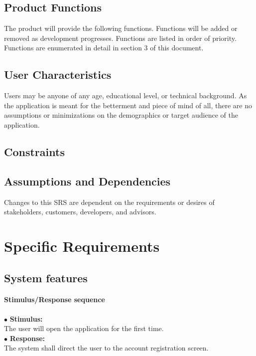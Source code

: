 \documentclass{scrreprt}
\begin{document}
\section{Product Functions}
The product will provide the following functions. Functions will be added or removed as 
development progresses. Functions are listed in order of priority. Functions are enumerated in detail in section 3 of this document.


\section{User Characteristics}
Users may be anyone of any age, educational level, or technical background. As the application is meant for the betterment and piece of mind of all, there are no assumptions or minimizations on the demographics or target audience of the application.


\section{Constraints}


\section{Assumptions and Dependencies}
Changes to this SRS are dependent on the requirements or desires of stakeholders, customers, developers, and advisors. 


\chapter{Specific Requirements}

\section{System features}


\subsubsection{Stimulus/Response sequence}
\vspace{5mm}
	$\bullet$ \textbf{Stimulus:} \\ \hspace{5mm} The user will open the application for the first time.\\
	$\bullet$ \textbf{Response:} \\ \hspace{5mm} The system shall direct the user to the account registration screen.
\end{document}
